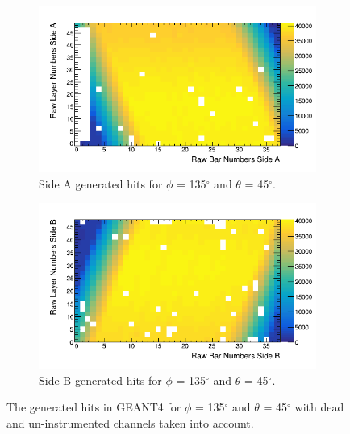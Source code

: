 \begin{figure}[htbp]
\centering
\begin{subfigure}{.5\textwidth}
  \centering
  \includegraphics[width=\linewidth]{Chapter5/Figs/cosmicTrackerUncertainties/sideAGen_PVsT_135_45.png}
  \captionsetup{width=.9\linewidth}
  \caption{Side A generated hits for $\phi$ =  135$^\circ$ and $\theta$ = 45$^\circ$.}
  \label{subFig:sideAGen_PVsT_135_45}
\end{subfigure}%
\begin{subfigure}{.5\textwidth}
  \centering
\includegraphics[width=\linewidth]{Chapter5/Figs/cosmicTrackerUncertainties/sideBGen_PVsT_135_45.png}
  \captionsetup{width=.9\linewidth}
  \caption{Side B generated hits for $\phi$ = 135$^\circ$ and $\theta$ = 45$^\circ$.}
  \label{subFig:sideBGen_PVsT_135_45}
\end{subfigure}
\caption{The generated hits in GEANT4 for $\phi$ = 135$^\circ$ and $\theta$ = 45$^\circ$ with dead and un-instrumented channels taken into account.}
\label{fig:sideABGen_PVsT_135_45}
\end{figure}


